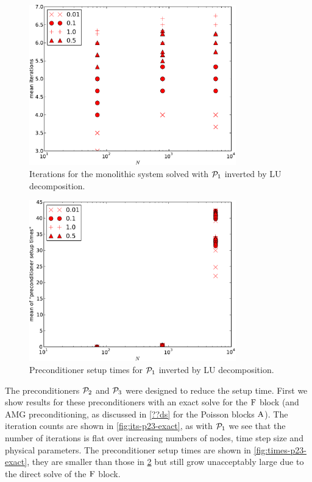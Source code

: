 \begin{figure}
  \centering
  \includegraphics[width=0.8\textwidth]{plots/linear_solvers/som-main-exactimplicitdummy-meanofnsolveritersvsinitialnnode.pdf}
  \caption{Iterations for the monolithic system solved with $\mathcal{P}_1$ inverted by LU decomposition.}
  \label{fig:its-p1-exact}
\end{figure}


\begin{figure}
  \centering
  \includegraphics[width=0.8\textwidth]{plots/linear_solvers/som-main-exactimplicitdummy-meanofpreconditionersetuptimesvsinitialnnode.pdf}
  \caption{Preconditioner setup times for $\mathcal{P}_1$ inverted by LU decomposition.}
  \label{fig:times-p1-exact}
\end{figure}

The preconditioners $\mathcal{P}_2$ and $\mathcal{P}_3$ were designed to reduce the setup time.
First we show results for these preconditioners with an exact solve for the $\mathrm{F}$ block (and AMG preconditioning, as discussed in \cref{??ds} for the Poisson blocks $\mathrm{A}$).
The iteration counts are shown in \cref{fig:its-p23-exact}, as with $\mathcal{P}_1$ we see that the number of iterations is flat over increasing numbers of nodes, time step size and physical parameters.
The preconditioner setup times are shown in \cref{fig:times-p23-exact}, they are smaller than those in \cref{fig:times-p1-exact} but still grow unacceptably large due to the direct solve of the $\mathrm{F}$ block. 

